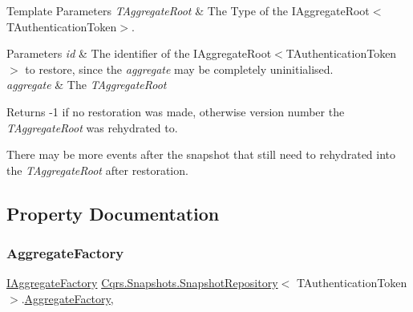 \begin{DoxyTemplParams}{Template Parameters}
{\em T\+Aggregate\+Root} & The Type of the I\+Aggregate\+Root$<$\+T\+Authentication\+Token$>$.\\
\hline
\end{DoxyTemplParams}

\begin{DoxyParams}{Parameters}
{\em id} & The identifier of the I\+Aggregate\+Root$<$\+T\+Authentication\+Token$>$ to restore, since the {\itshape aggregate}  may be completely uninitialised.\\
\hline
{\em aggregate} & The {\itshape T\+Aggregate\+Root} \\
\hline
\end{DoxyParams}
\begin{DoxyReturn}{Returns}
-\/1 if no restoration was made, otherwise version number the {\itshape T\+Aggregate\+Root}  was rehydrated to.
\end{DoxyReturn}


There may be more events after the snapshot that still need to rehydrated into the {\itshape T\+Aggregate\+Root}  after restoration.

\subsection{Property Documentation}
\mbox{\label{classCqrs_1_1Snapshots_1_1SnapshotRepository_a833748fa79fd234067b61927c57bc60f_a833748fa79fd234067b61927c57bc60f}} 
\subsubsection{\texorpdfstring{Aggregate\+Factory}{AggregateFactory}}
{\footnotesize\ttfamily \hyperlink{interfaceCqrs_1_1Domain_1_1Factories_1_1IAggregateFactory}{I\+Aggregate\+Factory} \hyperlink{classCqrs_1_1Snapshots_1_1SnapshotRepository}{Cqrs.\+Snapshots.\+Snapshot\+Repository}$<$ T\+Authentication\+Token $>$.\hyperlink{classCqrs_1_1Domain_1_1Factories_1_1AggregateFactory}{Aggregate\+Factory}\hspace{0.3cm}{\ttfamily [get]}, {\ttfamily [protected]}}



